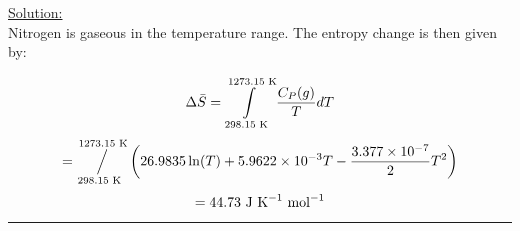\noindent
\underline{Solution:}\\

Nitrogen is gaseous in the temperature range. The entropy change is then given by:

$$\Delta\bar{S} = \int\limits_{298.15\textnormal{ K}}^{1273.15\textnormal{ K}}\frac{C_P(g)}{T}dT$$ 
$$= \sijoitus{298.15\textnormal{ K}}{1273.15\textnormal{ K}}\left(26.9835\ln(T) + 5.9622\times 10^{-3}T - \frac{3.377\times 10^{-7}}{2}T^2\right)$$
$$= 44.73\textnormal{ J K}^{-1}\textnormal{ mol}^{-1}$$

\hrule\vspace{0.5cm}
